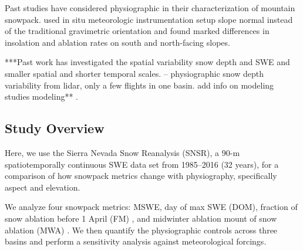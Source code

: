 Past studies have considered physiographic in their characterization of mountain snowpack. \cite{pomeroyVariationSurfaceEnergetics2003} used in situ meteorologic instrumentation setup slope normal instead of the traditional gravimetric orientation and found marked differences in insolation and ablation rates on south and north-facing slopes. 


***Past work has investigated the spatial variability snow depth and SWE and smaller spatial and shorter temporal scales.
-- \citep{kirchnerLiDARMeasurementSeasonal2014, tennantRegionalSensitivitiesSeasonal2017} physiographic snow depth variability from lidar, only a few flights in one basin. add info on modeling studies %
modeling** \citep{mazzottiCanopyStructureTopography2023, lopez-morenoEffectSlopeAspect2014}. 

\subsection{Study Overview}
Here, we use the Sierra Nevada Snow Reanalysis (SNSR), a 90-m spatiotemporally continuous SWE data set from 1985--2016 (32 years), for a comparison of how snowpack metrics change with physiography, specifically aspect and elevation.

We analyze four snowpack metrics: MSWE, day of max SWE (DOM), fraction of snow ablation before 1 April (FM) \citep{musselmanWinterMeltTrends2021}, and midwinter ablation mount of snow ablation (MWA) \citep{harpoldHumidityDeterminesSnowpack2018}. We then quantify the physiographic controls across three basins and perform a sensitivity analysis against meteorological forcings.





